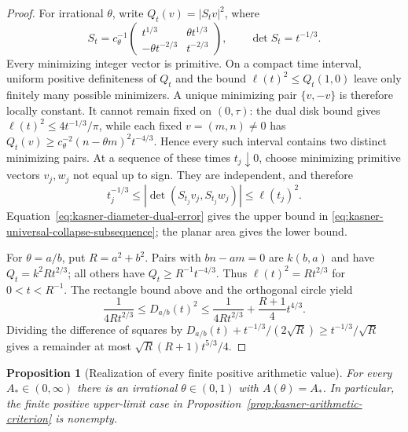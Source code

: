 \documentclass[10pt,a4paper]{article}
\numberwithin{equation}{section}
\newtheorem{proposition}[theorem]{Proposition}
\theoremstyle{definition}
\theoremstyle{remark}
\begin{document}
\begin{proof}
For irrational $\theta$, write $Q_t(v)=|S_tv|^2$, where
\[
 S_t=c_\theta^{-1}
 \begin{pmatrix}t^{1/3}&\theta t^{1/3}\\
 -\theta t^{-2/3}&t^{-2/3}\end{pmatrix},\qquad
 \det S_t=t^{-1/3}.
\]
Every minimizing integer vector is primitive.  On a compact time
interval, uniform positive definiteness of $Q_t$ and the bound
$\ell(t)^2\le Q_t(1,0)$ leave only finitely many possible minimizers.
A unique minimizing pair $\{v,-v\}$ is therefore locally constant.
It cannot remain fixed on $(0,\tau)$: the dual disk bound gives
$\ell(t)^2\le4t^{-1/3}/\pi$, while each fixed $v=(m,n)\ne0$
has $Q_t(v)\ge c_\theta^{-2}(n-\theta m)^2t^{-4/3}$.
Hence every such interval contains two distinct minimizing pairs.
At a sequence of these times $t_j\downarrow0$, choose minimizing
primitive vectors $v_j,w_j$ not equal up to sign.  They are independent,
and therefore
\[
 t_j^{-1/3}\le|\det(S_{t_j}v_j,S_{t_j}w_j)|
 \le\ell(t_j)^2.
\]
Equation~\eqref{eq:kasner-diameter-dual-error} gives the upper
bound in \eqref{eq:kasner-universal-collapse-subsequence}; the
planar area gives the lower bound.

For $\theta=a/b$, put $R=a^2+b^2$.
Pairs with $bn-am=0$ are $k(b,a)$ and have
$Q_t=k^2Rt^{2/3}$; all others have $Q_t\ge R^{-1}t^{-4/3}$.
Thus $\ell(t)^2=Rt^{2/3}$ for $0<t<R^{-1}$.
The rectangle bound above and the orthogonal circle yield
\[
 \frac1{4Rt^{2/3}}\le D_{a/b}(t)^2
 \le\frac1{4Rt^{2/3}}+\frac{R+1}{4}t^{4/3}.
\]
Dividing the difference of squares by
$D_{a/b}(t)+t^{-1/3}/(2\sqrt R)\ge t^{-1/3}/\sqrt R$
gives a remainder at most $\sqrt R(R+1)t^{5/3}/4$.
\end{proof}

\begin{proposition}[Realization of every finite positive arithmetic value]
\label{prop:kasner-arithmetic-realization}
For every $A_*\in(0,\infty)$ there is an irrational $\theta\in(0,1)$
with $A(\theta)=A_*$.  In particular, the finite positive upper-limit
case in Proposition~\ref{prop:kasner-arithmetic-criterion} is nonempty.
\end{proposition}
\end{document}

